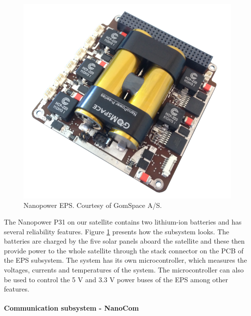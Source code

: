 \documentclass[english,12pt,a4paper,pdftex,elec,utf8]{aaltothesis}
\begin{document}
\begin{figure}[h!]
\centering
\includegraphics[scale=0.2]{nanopower}
\caption{Nanopower EPS. Courtesy of GomSpace A/S. \cite{nanopowerds}}
\label{nanopower}
\end{figure}
The Nanopower P31 on our satellite contains two lithium-ion batteries and has several reliability features. Figure \ref{nanopower} presents how the subsystem looks. The batteries are charged by the five solar panels aboard the satellite and these then provide power to the whole satellite through the stack connector on the PCB of the EPS subsystem. The system has its own microcontroller, which measures the voltages, currents and temperatures of the system. The microcontroller can also be used to control the 5 V and 3.3 V power buses of the EPS among other features. \cite{nanopowerds}
\\
\\
\textbf{Communication subsystem - NanoCom}\\
\end{document}
